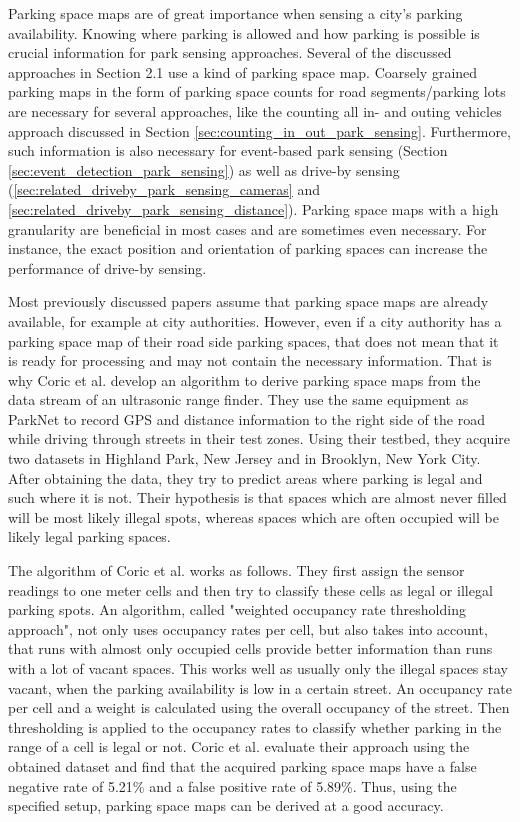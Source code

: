 Parking space maps are of great importance when sensing a city's parking availability. Knowing where parking is allowed and how parking is possible is crucial information for park sensing approaches. Several of the discussed approaches in Section 2.1 use a kind of parking space map. Coarsely grained parking maps in the form of parking space counts for road segments/parking lots are necessary for several approaches, like the counting all in- and outing vehicles approach discussed in Section \ref{sec:counting_in_out_park_sensing}. Furthermore, such information is also necessary for event-based park sensing (Section \ref{sec:event_detection_park_sensing}) as well as drive-by sensing (\ref{sec:related_driveby_park_sensing_cameras} and \ref{sec:related_driveby_park_sensing_distance}). Parking space maps with a high granularity are beneficial in most cases and are sometimes even necessary. For instance, the exact position and orientation of parking spaces can increase the performance of drive-by sensing.

Most previously discussed papers assume that parking space maps are already available, for example at city authorities. However, even if a city authority has a parking space map of their road side parking spaces, that does not mean that it is ready for processing and may not contain the necessary information. That is why Coric et al. \cite{Coric2013} develop an algorithm to derive parking space maps from the data stream of an ultrasonic range finder. They use the same equipment as ParkNet \cite{Mathur:2010:PDS:1814433.1814448} to record GPS and distance information to the right side of the road while driving through streets in their test zones. Using their testbed, they acquire two datasets in Highland Park, New Jersey and in Brooklyn, New York City. After obtaining the data, they try to predict areas where parking is legal and such where it is not. Their hypothesis is that spaces which are almost never filled will be most likely illegal spots, whereas spaces which are often occupied will be likely legal parking spaces.

The algorithm of Coric et al. works as follows. They first assign the sensor readings to one meter cells and then try to classify these cells as legal or illegal parking spots. An algorithm, called "weighted occupancy rate thresholding approach", not only uses occupancy rates per cell, but also takes into account, that runs with almost only occupied cells provide better information than runs with a lot of vacant spaces. This works well as usually only the illegal spaces stay vacant, when the parking availability is low in a certain street. An occupancy rate per cell and a weight is calculated using the overall occupancy of the street. Then thresholding is applied to the occupancy rates to classify whether parking in the range of a cell is legal or not. Coric et al. evaluate their approach using the obtained dataset and find that the acquired parking space maps have a false negative rate of 5.21\% and a false positive rate of 5.89\%. Thus, using the specified setup, parking space maps can be derived at a good accuracy.


